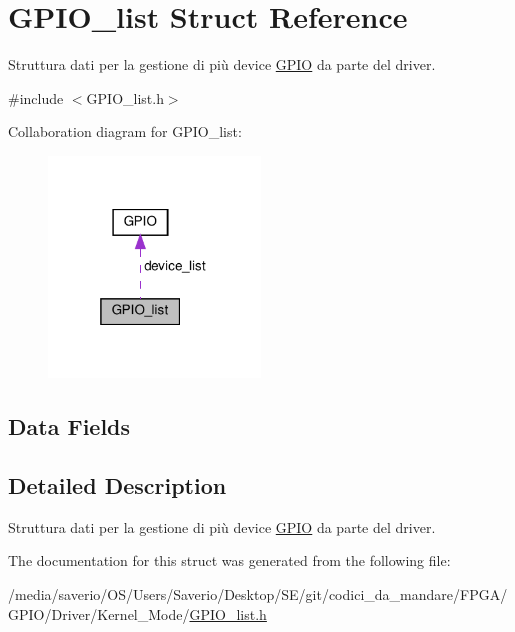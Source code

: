 \hypertarget{structGPIO__list}{}\section{G\+P\+I\+O\+\_\+list Struct Reference}
\label{structGPIO__list}


Struttura dati per la gestione di più device \hyperlink{structGPIO}{G\+P\+IO} da parte del driver.  




{\ttfamily \#include $<$G\+P\+I\+O\+\_\+list.\+h$>$}



Collaboration diagram for G\+P\+I\+O\+\_\+list\+:\nopagebreak
\begin{figure}[H]
\begin{center}
\leavevmode
\includegraphics[width=160pt]{structGPIO__list__coll__graph}
\end{center}
\end{figure}
\subsection*{Data Fields}


\subsection{Detailed Description}
Struttura dati per la gestione di più device \hyperlink{structGPIO}{G\+P\+IO} da parte del driver. 

The documentation for this struct was generated from the following file\+:\begin{DoxyCompactItemize}
\item 
/media/saverio/\+O\+S/\+Users/\+Saverio/\+Desktop/\+S\+E/git/codici\+\_\+da\+\_\+mandare/\+F\+P\+G\+A/\+G\+P\+I\+O/\+Driver/\+Kernel\+\_\+\+Mode/\hyperlink{GPIO__list_8h}{G\+P\+I\+O\+\_\+list.\+h}\end{DoxyCompactItemize}
